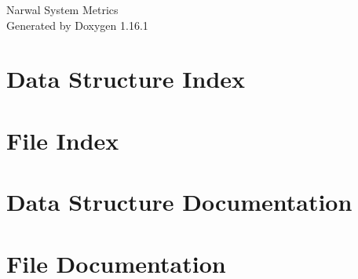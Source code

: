 \documentclass[twoside]{book}
\newcommand{\+}{\discretionary{\mbox{\scriptsize$\hookleftarrow$}}{}{}}
\newcommand{\clearemptydoublepage}{%
    \newpage{\pagestyle{empty}\cleardoublepage}%
  }
\begin{document}
  \raggedbottom
    \hypersetup{pageanchor=false,
                bookmarksnumbered=true,
                pdfencoding=unicode
               }
  \begin{titlepage}
  \vspace*{7cm}
  \begin{center}%
  {\Large Narwal System Metrics}\\
  \vspace*{1cm}
  {\large Generated by Doxygen 1.16.1}\\
  \end{center}
  \end{titlepage}
  \clearemptydoublepage
  \tableofcontents
  \clearemptydoublepage
  \hypersetup{pageanchor=true}
\chapter{Data Structure Index}

\chapter{File Index}

\chapter{Data Structure Documentation}


\chapter{File Documentation}






  \backmatter
  \newpage
  \clearemptydoublepage
  \printindex
\end{document}
